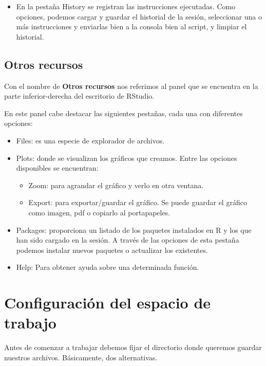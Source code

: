 \documentclass[
]{book}
\providecommand{\tightlist}{%
  \setlength{\itemsep}{0pt}\setlength{\parskip}{0pt}}
\begin{document}
\begin{itemize}
\tightlist
\item
  En la pestaña History se registran las instrucciones ejecutadas. Como opciones, podemos cargar y guardar el historial de la sesión, seleccionar una o más instrucciones y enviarlas bien a la consola bien al script, y limpiar el historial.
\end{itemize}

\hypertarget{otros-recursos}{%
\subsection{Otros recursos}\label{otros-recursos}}

Con el nombre de \textbf{Otros recursos} nos referimos al panel que se encuentra en la parte inferior-derecha del escritorio de RStudio.

En este panel cabe destacar las siguientes pestañas, cada una con diferentes opciones:

\begin{itemize}
\item
  Files: es una especie de explorador de archivos.
\item
  Plots: donde se visualizan los gráficos que creamos. Entre las opciones disponibles se encuentran:

  \begin{itemize}
  \tightlist
  \item
    Zoom: para agrandar el gráfico y verlo en otra ventana.
  \item
    Export: para exportar/guardar el gráfico. Se puede guardar el gráfico como imagen, pdf o copiarlo al portapapeles.
  \end{itemize}
\item
  Packages: proporciona un listado de los paquetes instalados en R y los que han sido cargado en la sesión. A través de las opciones de esta pestaña podemos instalar nuevos paquetes o actualizar los existentes.
\item
  Help: Para obtener ayuda sobre una determinada función.
\end{itemize}

\hypertarget{configuraciuxf3n-del-espacio-de-trabajo}{%
\section{Configuración del espacio de trabajo}\label{configuraciuxf3n-del-espacio-de-trabajo}}

Antes de comenzar a trabajar debemos fijar el directorio donde queremos guardar nuestros archivos. Básicamente, dos alternativas.
\end{document}
